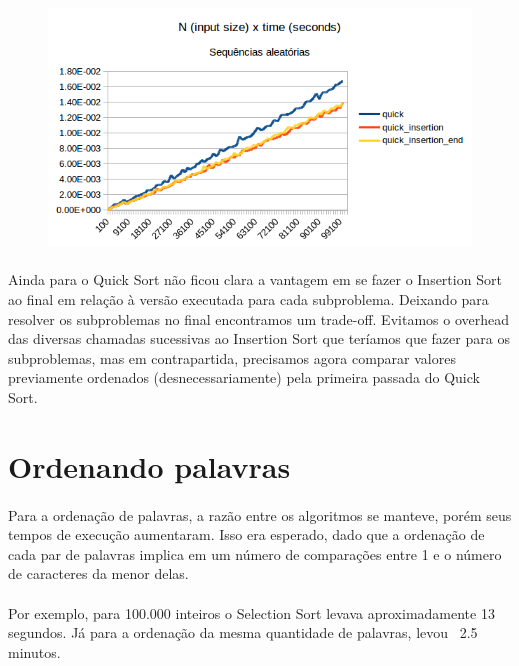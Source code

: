 \documentclass[11pt,a4paper]{article}
\begin{document}
\begin{figure}[htb]
  \begin{center}
      \includegraphics[width=1\textwidth]{a}
  \end{center}
      \label{fig:m}
\end{figure}

    \paragraph{}
    Ainda para o Quick Sort não ficou clara a vantagem em se fazer o Insertion Sort ao final em relação à versão executada para cada subproblema. Deixando para resolver os subproblemas no final encontramos um trade-off. Evitamos o overhead das diversas chamadas sucessivas ao Insertion Sort que teríamos que fazer para os subproblemas, mas em contrapartida, precisamos agora comparar valores previamente ordenados (desnecessariamente) pela primeira passada do Quick Sort.


    \section{Ordenando palavras}
    \paragraph{}
    Para a ordenação de palavras, a razão entre os algoritmos se manteve, porém seus tempos de execução aumentaram. Isso era esperado, dado que a ordenação de cada par de palavras implica em um número de comparações entre 1 e o número de caracteres da menor delas.
    \paragraph{}
    Por exemplo, para 100.000 inteiros o Selection Sort levava aproximadamente 13 segundos. Já para a ordenação da mesma quantidade de palavras, levou ~2.5 minutos.
\end{document}
